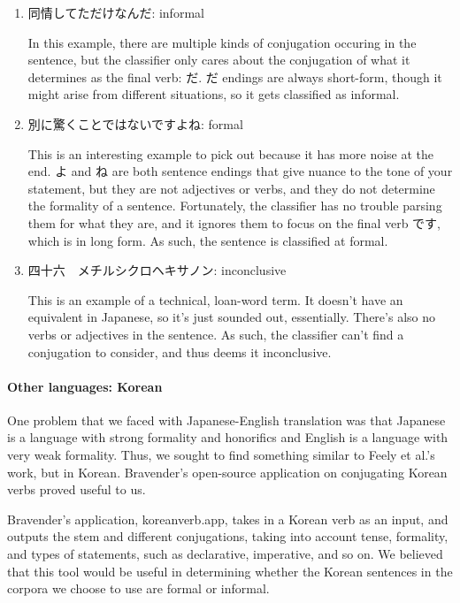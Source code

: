 \documentclass[11pt]{article}
\begin{document}
\begin{enumerate}[label=\arabic*]
    \item 同情してただけなんだ: informal
    
    In this example, there are multiple kinds of conjugation occuring in the sentence, but the classifier only cares about the conjugation of what it determines as the final verb: だ. だ endings are always short-form, though it might arise from different situations, so it gets classified as informal.

    \item 別に驚くことではないですよね: formal

    This is an interesting example to pick out because it has more noise at the end. よ and ね are both sentence endings that give nuance to the tone of your statement, but they are not adjectives or verbs, and they do not determine the formality of a sentence. Fortunately, the classifier has no trouble parsing them for what they are, and it ignores them to focus on the final verb です, which is in long form. As such, the sentence is classified at formal.

    \item 四十六　メチルシクロヘキサノン: inconclusive
    
    This is an example of a technical, loan-word term. It doesn't have an equivalent in Japanese, so it's just sounded out, essentially. There's also no verbs or adjectives in the sentence. As such, the classifier can't find a conjugation to consider, and thus deems it inconclusive.
\end{enumerate}

\paragraph{Other languages: Korean}

One problem that we faced with Japanese-English translation was that Japanese is a language with strong formality and honorifics and English is a language with very weak formality. Thus, we sought to find something similar to Feely et al.'s work, but in Korean. Bravender's open-source application on conjugating Korean verbs proved useful to us.

Bravender's application, koreanverb.app, takes in a Korean verb as an input, and outputs the stem and different conjugations, taking into account tense, formality, and types of statements, such as declarative, imperative, and so on. We believed that this tool would be useful in determining whether the Korean sentences in the corpora we choose to use are formal or informal.
\end{document}
